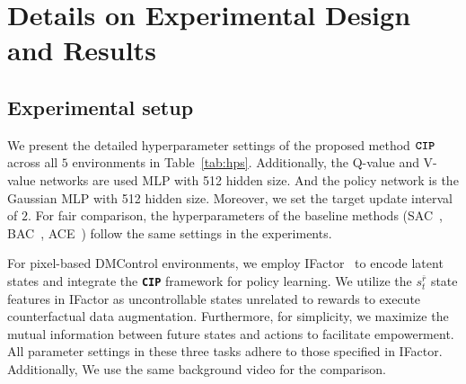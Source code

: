 \section{Details on Experimental Design and Results}
\label{Details on Experimental Design and Results}

\subsection{Experimental setup}
\label{sec:experimental_setup_appendix}
We present the detailed hyperparameter settings of the proposed method $\texttt{\textbf{CIP}}$ across all $5$ environments in Table~\ref{tab:hps}. Additionally, the Q-value and V-value networks are used MLP with 512 hidden size. And the policy network is the Gaussian MLP with 512 hidden size. Moreover, we set the target update interval of $2$. For fair comparison, the hyperparameters of the baseline methods (SAC~\citep{haarnoja2018soft}, BAC~\citep{ji2023seizing}, ACE~\citep{ji2024ace}) follow the same settings in the experiments.

For pixel-based DMControl environments, we employ IFactor~\citep{liu2024learning} to encode latent states and integrate the \texttt{\textbf{CIP}} framework for policy learning. We utilize the $s_{t}^{\bar{r}}$ state features in IFactor as uncontrollable states unrelated to rewards to execute counterfactual data augmentation. Furthermore, for simplicity, we maximize the mutual information between future states and actions to facilitate empowerment. All parameter settings in these three tasks adhere to those specified in IFactor. Additionally, We use the same background video for the comparison. 

